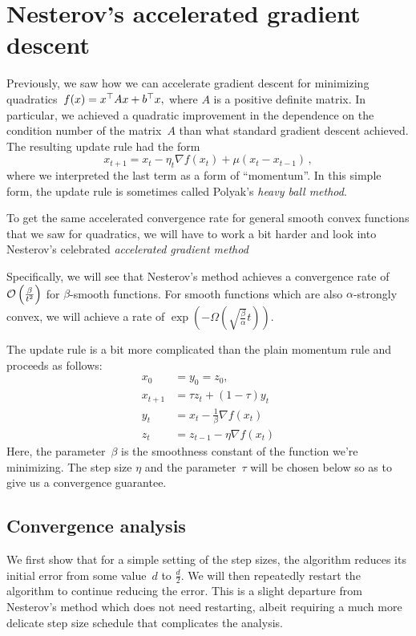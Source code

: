 \section{Nesterov’s accelerated gradient descent}

Previously, we saw how we can accelerate gradient descent for minimizing
quadratics~$f(x)=x^\top A x+b^\top x,$ where $A$ is a positive definite
matrix. In particular, we achieved a quadratic improvement in the dependence
on the condition number of the matrix~$A$ than what standard gradient descent
achieved. The resulting update rule had the form
\[
x_{t+1} = x_t -\eta_t\nabla f(x_t) + \mu(x_t-x_{t-1})\,,
\]
where we interpreted the last term as a form of ``momentum''. In this simple
form, the update rule is sometimes called Polyak's \emph{heavy ball method}.

To get the same accelerated convergence rate for general smooth convex functions
that we saw for quadratics, we will have to work a bit harder and look into
Nesterov's celebrated \emph{accelerated gradient method}~\cite{nesterov83,
nesterov04}

Specifically, we will see that Nesterov's method achieves a convergence rate
of~${\cal O} \left(\frac{\beta}{t^2}\right)$ for $\beta$-smooth functions. For smooth
functions which are also $\alpha$-strongly convex, we will achieve a rate of
$\exp\left( -\Omega\left(\sqrt{\frac{\beta}{\alpha}} t\right)\right)$. 

The update rule is a bit more complicated than the plain momentum rule 
and proceeds as follows:
\begin{align*}
x_0 &= y_0 = z_0, \\
x_{t+1} &= \tau z_t + (1 - \tau) y_t \tag{$t\ge 0$}\\
y_t &= x_t - \frac{1}{\beta} \nabla f(x_t) \tag{$t\ge 1$}\\
z_t &= z_{t-1} - \eta\nabla f(x_t)\tag{$t\ge 1$}
\end{align*}
Here, the parameter~$\beta$ is the smoothness constant of the function we're
minimizing. The step size $\eta$ and the parameter~$\tau$ will be chosen below
so as to give us a convergence guarantee.

\subsection{Convergence analysis}

We first show that for a simple setting of the step sizes, the algorithm reduces
its initial error from some value~$d$ to $\frac{d}{2}.$ We will then repeatedly
restart the algorithm to continue reducing the error. This is a slight departure
from Nesterov's method which does not need restarting, albeit requiring a much
more delicate step size schedule that complicates the analysis.


